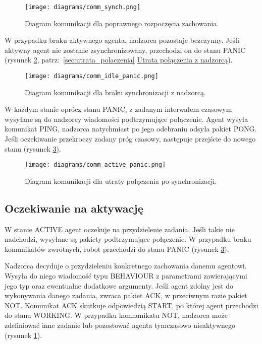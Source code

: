 \begin{figure}[!ht]
    \centering
        \texttt{[image: diagrams/comm\_synch.png]}
    \caption{Diagram komunikacji dla poprawnego rozpoczęcia zachowania.\label{fig:comm_synch}}
\end{figure}

W przypadku braku aktywnego agenta, nadzorca pozostaje bezczynny. Jeśli\,aktywny agent nie zostanie zsynchronizowany, przechodzi on do stanu PANIC (rysunek \ref{fig:comm_idle_panic}, patrz:~\ref{sec:utrata_polaczenia} \hyperref[sec:utrata_polaczenia]{Utrata połączenia z nadzorcą}).

\begin{figure}[!ht]
    \centering
        \texttt{[image: diagrams/comm\_idle\_panic.png]}
    \caption{Diagram komunikacji dla braku synchronizacji z nadzorcą.\label{fig:comm_idle_panic}}
\end{figure}

W każdym stanie oprócz stanu PANIC, z zadanym interwałem czasowym wysyłane są do nadzorcy wiadomości podtrzymujące połączenie. Agent wysyła komunikat PING, nadzorca natychmiast po jego odebraniu odsyła pakiet PONG. Jeśli oczekiwanie przekroczy zadany próg czasowy, następuje przejście do nowego stanu (rysunek {\ref{fig:comm_active_panic}}).

\begin{figure}[!ht]
    \centering
        \texttt{[image: diagrams/comm\_active\_panic.png]}
    \caption{Diagram komunikacji dla utraty połączenia po synchronizacji.\label{fig:comm_active_panic}}
\end{figure}

\subsection{Oczekiwanie na aktywację}

W stanie ACTIVE agent oczekuje na przydzielenie zadania. Jeśli takie nie nadchodzi, wysyłane są pakiety podtrzymujące połączenie. W przypadku braku komunikatów zwrotnych, robot przechodzi do stanu PANIC (rysunek \ref{fig:comm_active_panic}).

Nadzorca decyduje o przydzieleniu konkretnego zachowania danemu agentowi. Wysyła do niego wiadomość typu BEHAVIOUR z parametrami zawierającymi jego typ oraz ewentualne dodatkowe argumenty. Jeśli agent zdolny jest do wykonywania danego zadania, zwraca pakiet ACK, w przeciwnym razie pakiet NOT. Komunikat ACK skutkuje odpowiedzią START, po której agent przechodzi do stanu WORKING. W przypadku komnunikatu NOT, nadzorca może zdefiniować inne zadanie lub pozostować agenta tymczasowo nieaktywnego (rysunek \ref{fig:comm_synch}).


